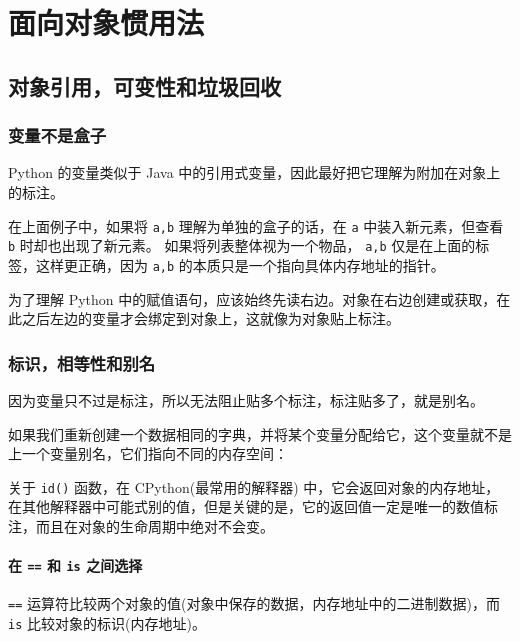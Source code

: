 \chapter{面向对象惯用法}
\section{对象引用，可变性和垃圾回收}
\subsection{变量不是盒子}

Python 的变量类似于 Java 中的引用式变量，因此最好把它理解为附加在对象上的标注。



在上面例子中，如果将 \texttt{a,b} 理解为单独的盒子的话，在 \texttt{a} 中装入新元素，但查看 \texttt{b} 时却也出现了新元素。 如果将列表整体视为一个物品， \texttt{a,b} 仅是在上面的标签，这样更正确，因为 \texttt{a,b} 的本质只是一个指向具体内存地址的指针。

为了理解 Python 中的赋值语句，应该始终先读右边。对象在右边创建或获取，在此之后左边的变量才会绑定到对象上，这就像为对象贴上标注。

\subsection{标识，相等性和别名}

因为变量只不过是标注，所以无法阻止贴多个标注，标注贴多了，就是别名。



如果我们重新创建一个数据相同的字典，并将某个变量分配给它，这个变量就不是上一个变量别名，它们指向不同的内存空间：



关于 \texttt{id()} 函数，在 CPython(最常用的解释器) 中，它会返回对象的内存地址，在其他解释器中可能式别的值，但是关键的是，它的返回值一定是唯一的数值标注，而且在对象的生命周期中绝对不会变。

\subsubsection{在 \texttt{==} 和 \texttt{is} 之间选择}

\texttt{==} 运算符比较两个对象的值(对象中保存的数据，内存地址中的二进制数据)，而 \texttt{is} 比较对象的标识(内存地址)。

